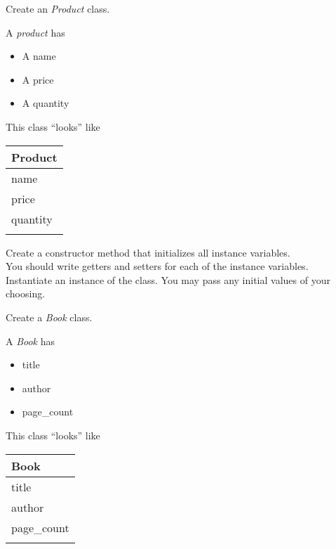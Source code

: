 



	\item Create an \textit{Product} class.\\
	\begin{minipage}{.6\textwidth}
		A \textit{product} has
		\begin{itemize}
			\item A name
			\item A price
			\item A quantity	
		\end{itemize}
	\end{minipage} 
	\begin{minipage}{.4\textwidth}
		This class ``looks'' like 
				
		\vspace*{1em}
		\begin{tabular}{|l|}
			\hline Product\\ \hline
			name\\ price\\ quantity\\ \hline
			\\  \hline
		\end{tabular}
	\end{minipage}

	\vspace*{2ex}
	Create a constructor method that initializes all instance variables.\\
	You should write getters and setters for each of the instance variables.\\
	Instantiate an instance of the class. You may pass any initial values of your choosing.


	\item Create a \textit{Book} class.\\	
	\begin{minipage}{.6\textwidth}
		A \textit{Book} has
		\begin{itemize}
			\item title 
			\item author
			\item page\_count	
		\end{itemize}
	\end{minipage}
	\begin{minipage}{.4\textwidth}
		This class ``looks'' like 
				
		\vspace*{1em}
		\begin{tabular}{|l|}
			\hline Book\\ \hline
			title\\ author\\ page\_count\\ \hline
			\\  \hline
		\end{tabular}
	\end{minipage}

